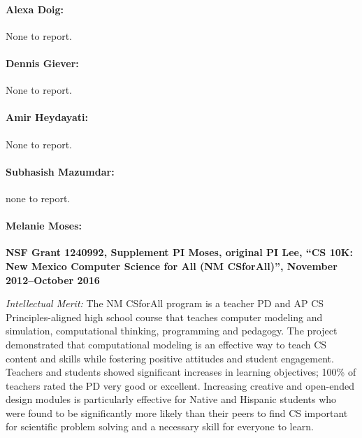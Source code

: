 \paragraph{Alexa Doig:} None to report.

\paragraph{Dennis Giever:} None to report.

\paragraph{Amir Heydayati:} None to report.

\paragraph{Subhasish Mazumdar:} none to report.

\paragraph{Melanie Moses:}
\textbf{NSF Grant 1240992, Supplement PI Moses, original PI Lee, ``CS 10K: New Mexico Computer Science for All (NM CSforAll)'', November 2012--October 2016} 

\noindent \textit{Intellectual Merit:} The NM CSforAll program is a teacher PD and AP CS Principles-aligned high school course that teaches computer modeling and simulation, computational thinking, programming and pedagogy. %
The project demonstrated that computational modeling is an effective way to teach CS content and skills while fostering positive attitudes and student engagement.
Teachers and students showed significant increases in learning objectives; 100\% of teachers rated the PD very good or excellent. Increasing creative and open-ended design modules is particularly effective for Native and Hispanic students who were found to be significantly more likely than their peers to find CS important for scientific problem solving and a necessary skill for everyone to learn.

